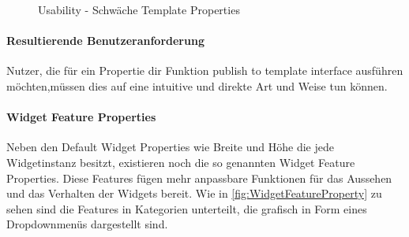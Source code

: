 \begin{figure}%
  \centering
  \qquad
  \caption{Usability - Schwäche Template Properties}%
  \label{fig:TemplateProperties}
\end{figure}


\paragraph{Resultierende Benutzeranforderung}
Nutzer, die für ein Propertie dir Funktion publish to template interface ausführen möchten,müssen dies auf eine intuitive und direkte Art und Weise tun können.

\paragraph{Widget Feature Properties}

Neben den Default Widget Properties  wie Breite und Höhe die jede Widgetinstanz besitzt, existieren noch die so genannten Widget Feature Properties.
Diese Features fügen mehr anpassbare Funktionen für das Aussehen und das Verhalten der Widgets bereit.
Wie in \cref{fig:WidgetFeatureProperty} zu sehen sind die Features in Kategorien unterteilt, die grafisch in Form eines Dropdownmenüs dargestellt sind.

